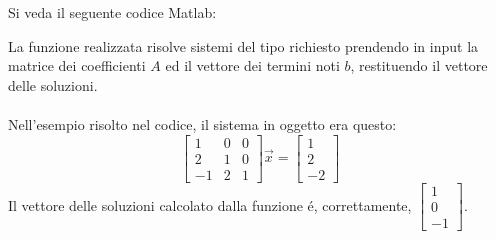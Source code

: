 \begin{center}
\footnotesize\noindent{}\end{center}

\noindent Si veda il seguente codice Matlab:



\noindent La funzione realizzata risolve sistemi del tipo richiesto prendendo in input la matrice dei coefficienti \(A\) ed il vettore dei termini noti \(b\), restituendo il vettore delle soluzioni.
\\
\\
\noindent Nell'esempio risolto nel codice, il sistema in oggetto era questo:
\[
\begin{bmatrix}1 & 0 & 0 \\ 2 & 1 & 0\\ -1 & 2 & 1 \end{bmatrix} \vec{x} = \begin{bmatrix}1 \\ 2 \\ -2 \end{bmatrix}
\]
\noindent Il vettore delle soluzioni calcolato dalla funzione \'e, correttamente, \(\begin{bmatrix}1 \\ 0 \\ -1 \end{bmatrix}\).
